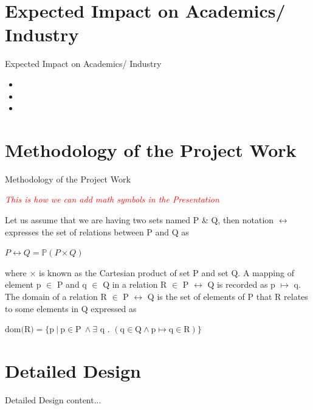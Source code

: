 \documentclass{beamer}
\begin{document}
\section{Expected Impact on Academics/ Industry}
\begin{frame}[t]{Expected Impact on Academics/ Industry}
	\begin{itemize}
		\item 
		\item 
		\item  
	\end{itemize}
	\end{frame}
\section{Methodology of the Project Work}
\begin{frame}[t]{Methodology of the Project Work}
\begin{center}
	\LARGE
	\textcolor{red}{\textit{This is how we can add math symbols in the Presentation}}\\ 
\end{center}
\normalsize
Let us assume that we are having two sets named P \& Q, then notation $\leftrightarrow$ expresses the set of relations between P and Q as \begin{center}
	$P \leftrightarrow Q = \mathbb{P}(P \times Q)$
\end{center} 
where $\times$ is known as the Cartesian product of set P and set Q. A mapping of element p $\in$ P and q $\in$ Q in a relation R $\in$  P $\leftrightarrow$ Q is recorded as p $\mapsto$ q. The domain of a relation R $\in$ P $\leftrightarrow$ Q is the set of elements of P that R relates to some elements in Q expressed as
\begin{center}
	$ \text{dom(R)} =\text{\{p}\ |\ \text{p}\in \text{P}\ \wedge \exists \text{\ q\ } \text{.\ }  (\text{q} \in \text{Q} \wedge \text{p}\mapsto \text{q}\in \text{R})  \} $
\end{center}

\end{frame}
\section{Detailed Design}
\begin{frame}{Detailed Design}
	content...
\end{frame}
\end{document}
